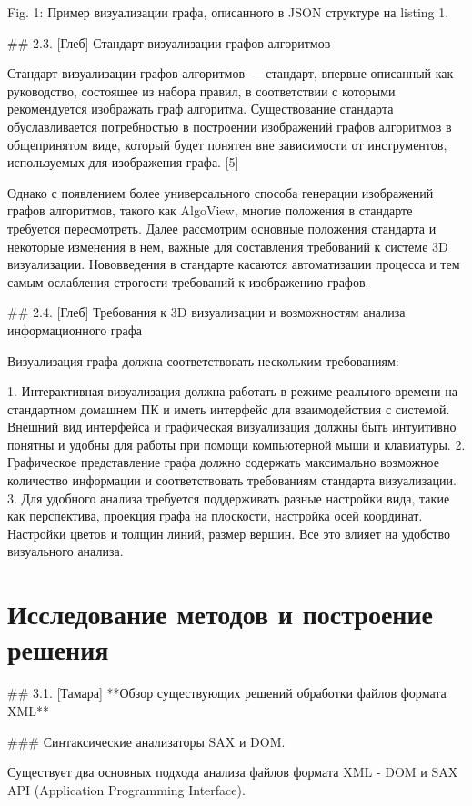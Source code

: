 Fig. 1: Пример визуализации графа, описанного в JSON структуре на listing 1.

## 2.3. [Глеб] Стандарт визуализации графов алгоритмов

Стандарт визуализации графов алгоритмов — стандарт, впервые описанный как руководство, состоящее из набора правил, в соответствии с которыми рекомендуется изображать граф алгоритма. Существование стандарта обуславливается потребностью в построении изображений графов алгоритмов в общепринятом виде, который будет понятен вне зависимости от инструментов, используемых для изображения графа. [5]

Однако с появлением более универсального способа генерации изображений графов алгоритмов, такого как AlgoView, многие положения в стандарте требуется пересмотреть. Далее рассмотрим основные положения стандарта и некоторые изменения в нем, важные для составления требований к системе 3D визуализации. Нововведения в стандарте касаются автоматизации процесса и тем самым ослабления строгости требований к изображению графов.

## 2.4. [Глеб] Требования к 3D визуализации и возможностям анализа информационного графа

Визуализация графа должна соответствовать нескольким требованиям:

1. Интерактивная визуализация должна работать в режиме реального времени на стандартном домашнем ПК и иметь интерфейс для взаимодействия с системой. Внешний вид интерфейса и графическая визуализация должны быть интуитивно понятны и удобны для работы при помощи компьютерной мыши и клавиатуры.
2. Графическое представление графа должно содержать максимально возможное количество информации и соответствовать требованиям стандарта визуализации.
3. Для удобного анализа требуется поддерживать разные настройки вида, такие как перспектива, проекция графа на плоскости, настройка осей координат. Настройки цветов и толщин линий, размер вершин. Все это влияет на удобство визуального анализа.

\section{Исследование методов и построение решения}

## 3.1. [Тамара] **Обзор существующих решений обработки файлов формата XML**

### Синтаксические анализаторы SAX и DOM.

Существует два основных подхода анализа файлов формата XML - DOM и SAX API (Application Programming Interface).

